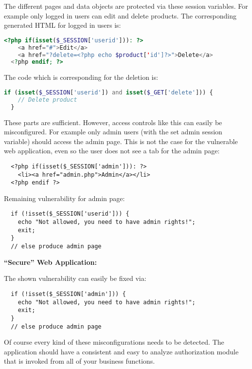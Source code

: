 The different pages and data objects are protected via these session variables. For example only logged in users can edit and delete products. The corresponding generated HTML for logged in users is:

\begin{lstlisting}[language=PHP]
  <?php if(isset($_SESSION['userid'])): ?>
    <a href="#">Edit</a>
    <a href="?delete=<?php echo $product['id']?>">Delete</a>
  <?php endif; ?>
\end{lstlisting}

The code which is corresponding for the deletion is:

\begin{lstlisting}[language=PHP]
  if (isset($_SESSION['userid']) and isset($_GET['delete'])) {
    // Delete product
  }
\end{lstlisting}

These parts are sufficient. However, access controls like this can easily be misconfigured. For example only admin users (with the set admin session variable) should access the admin page. This is not the case for the vulnerable web application, even so the user does not see a tab for the admin page:

\begin{lstlisting}
  <?php if(isset($_SESSION['admin'])): ?>
    <li><a href="admin.php">Admin</a></li>
  <?php endif ?>
\end{lstlisting}

Remaining vulnerability for admin page:

\begin{lstlisting}
  if (!isset($_SESSION['userid'])) {
    echo "Not allowed, you need to have admin rights!";
    exit;
  }
  // else produce admin page
\end{lstlisting}


\textbf{``Secure'' Web Application:}

The shown vulnerability can easily be fixed via:

\begin{lstlisting}
  if (!isset($_SESSION['admin'])) {
    echo "Not allowed, you need to have admin rights!";
    exit;
  }
  // else produce admin page
\end{lstlisting}

Of course every kind of these misconfigurations needs to be detected. The application should have a consistent and easy to analyze authorization module that is invoked from all of your business functions.
